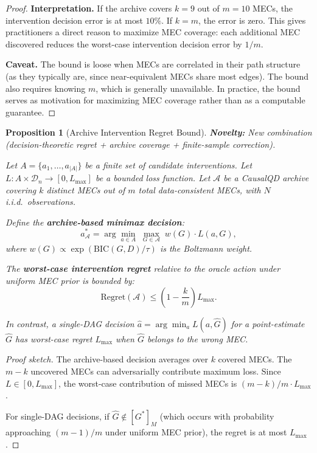 \documentclass{article}
\theoremstyle{definition}
\theoremstyle{plain}
\newtheorem{proposition}{Proposition}
\theoremstyle{remark}
\begin{document}
\begin{proof}
\textbf{Interpretation.}
If the archive covers $k = 9$ out of $m = 10$ MECs, the intervention decision
error is at most $10\%$. If $k = m$, the error is zero. This gives practitioners
a direct reason to maximize MEC coverage: each additional MEC discovered reduces
the worst-case intervention decision error by $1/m$.

\textbf{Caveat.}
The bound is loose when MECs are correlated in their path structure (as they
typically are, since near-equivalent MECs share most edges). The bound also
requires knowing $m$, which is generally unavailable. In practice, the bound
serves as motivation for maximizing MEC coverage rather than as a computable
guarantee.
\end{proof}

\begin{proposition}[Archive Intervention Regret Bound]
\label{prop:archive_regret}
\textbf{Novelty:} New combination (decision-theoretic regret + archive coverage + finite-sample correction).

Let $A = \{a_1, \ldots, a_{|A|}\}$ be a finite set of candidate interventions. Let
$L: A \times \mathcal{D}_n \to [0, L_{\max}]$ be a bounded loss function. Let
$\mathcal{A}$ be a CausalQD archive covering $k$ distinct MECs out of $m$ total
data-consistent MECs, with $N$ i.i.d.\ observations.

Define the \textbf{archive-based minimax decision}:
\begin{equation}
a^*_{\mathcal{A}} = \arg\min_{a \in A}\; \max_{G \in \mathcal{A}}\; w(G) \cdot L(a, G),
\end{equation}
where $w(G) \propto \exp(\mathrm{BIC}(G, D) / \tau)$ is the Boltzmann weight.

The \textbf{worst-case intervention regret} relative to the oracle action under
uniform MEC prior is bounded by:
\begin{equation}
\mathrm{Regret}(\mathcal{A}) \leq \left(1 - \frac{k}{m}\right) L_{\max}.
\end{equation}

In contrast, a single-DAG decision $\hat{a} = \arg\min_a L(a, \hat{G})$ for
a point-estimate $\hat{G}$ has worst-case regret $L_{\max}$ when $\hat{G}$ belongs
to the wrong MEC.
\end{proposition}

\begin{proof}[Proof sketch]
The archive-based decision averages over $k$ covered MECs. The $m - k$ uncovered
MECs can adversarially contribute maximum loss. Since $L \in [0, L_{\max}]$, the
worst-case contribution of missed MECs is $(m - k)/m \cdot L_{\max}$.

For single-DAG decisions, if $\hat{G} \notin [G^*]_M$ (which occurs with probability
approaching $(m-1)/m$ under uniform MEC prior), the regret is at most $L_{\max}$.
\end{proof}
\end{document}
